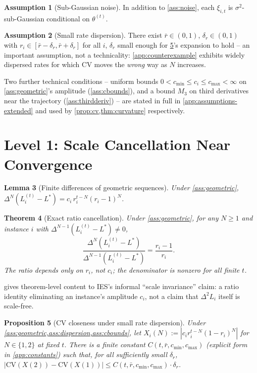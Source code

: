 \documentclass{article}
\theoremstyle{plain}
\newtheorem{theorem}{Theorem}[section]
\newtheorem{proposition}[theorem]{Proposition}
\newtheorem{lemma}[theorem]{Lemma}
\theoremstyle{definition}
\newtheorem{assumption}[theorem]{Assumption}
\theoremstyle{remark}
\newcommand{\CV}{\mathrm{CV}}
\begin{document}
\begin{assumption}[Sub-Gaussian noise]
\label{ass:subgaussian}
In addition to \cref{ass:noise}, each $\xi_{i,t}$ is $\sigma^2$-sub-Gaussian conditional on $\theta^{(t)}$.
\end{assumption}

\begin{assumption}[Small rate dispersion]
\label{ass:dispersion}
There exist $\bar r \in (0,1)$, $\delta_r \in (0,1)$ with $r_i \in [\bar r - \delta_r, \bar r + \delta_r]$ for all $i$, $\delta_r$ small enough for \cref{prop:cv}'s expansion to hold -- an important assumption, not a technicality: \cref{app:counterexample} exhibits widely dispersed rates for which CV moves the \emph{wrong} way as $N$ increases.
\end{assumption}

Two further technical conditions -- uniform bounds $0<c_{\min}\le c_i\le c_{\max}<\infty$ on \cref{ass:geometric}'s amplitude (\cref{ass:cbounds}), and a bound $M_3$ on third derivatives near the trajectory (\cref{ass:thirdderiv}) -- are stated in full in \cref{app:assumptions-extended} and used by \cref{prop:cv,thm:curvature} respectively.

\section{Level 1: Scale Cancellation Near Convergence}
\label{sec:level1}

\begin{lemma}[Finite differences of geometric sequences]
\label{lem:geomdiff}
Under \cref{ass:geometric}, $\Delta^N(L_i^{(t)}-L^*) = c_i\, r_i^{t-N}(r_i-1)^N$.
\end{lemma}
\begin{theorem}[Exact ratio cancellation]
\label{thm:ratio}
Under \cref{ass:geometric}, for any $N\ge1$ and instance $i$ with $\Delta^{N-1}(L_i^{(t)}-L^*)\ne0$,
\begin{equation}
\label{eq:ratio}
\frac{\Delta^N(L_i^{(t)}-L^*)}{\Delta^{N-1}(L_i^{(t)}-L^*)} = \frac{r_i-1}{r_i}.
\end{equation}
The ratio depends only on $r_i$, not $c_i$; the denominator is nonzero for all finite $t$.
\end{theorem}
 gives theorem-level content to IES's informal ``scale invariance'' claim: a ratio identity eliminating an instance's amplitude $c_i$, not a claim that $\Delta^2 L_i$ itself is scale-free.

\begin{proposition}[CV closeness under small rate dispersion]
\label{prop:cv}
Under \cref{ass:geometric,ass:dispersion,ass:cbounds}, let $X_i(N) := |c_i r_i^{t-N}(1-r_i)^N|$ for $N\in\{1,2\}$ at fixed $t$. There is a finite constant $C(t,\bar r,c_{\min},c_{\max})$ (explicit form in \cref{app:constants}) such that, for all sufficiently small $\delta_r$,
$\big|\CV(X(2)) - \CV(X(1))\big| \le C(t,\bar r,c_{\min},c_{\max})\cdot\delta_r$.
\end{proposition}
\end{document}
